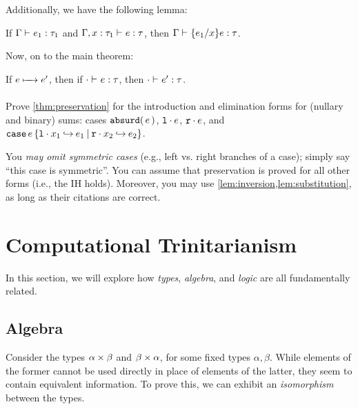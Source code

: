 \documentclass[11pt]{article}
\begin{document}
Additionally, we have the following lemma:
\begin{lemma}[Substitution]\label{lem:substitution}
  If $\Gamma \entails \IsOf{e_1}{\tau_1}$ and $\Gamma, \IsOf{x}{\tau_1} \entails \IsOf{e}{\tau}$,
  then $\Gamma \entails \IsOf{\Subst{e_1}{x}{e}}{\tau}$.
\end{lemma}

Now, on to the main theorem:

\begin{theorem}[Preservation]\label{thm:preservation}
  If $e \StepsTo e'$, then if $\cdot \entails \IsOf{e}{\tau}$, then $\cdot \entails \IsOf{e'}{\tau}$.
\end{theorem}

\begin{task}{25}
  Prove \cref{thm:preservation} for the introduction and elimination forms for (nullary and binary) sums:
  cases $\absurdexcst{\tau}{e}$, $\inlexcst{\tau_2}{e}$, $\inrexcst{\tau_1}{e}$, and $\caseexcst{e}{x_1}{\tau_1}{e_1}{x_2}{\tau_2}{e_2}$.

  You \emph{may omit symmetric cases} (e.g., left vs. right branches of a case); simply say ``this case is symmetric''.
  You can assume that preservation is proved for all other forms (i.e., the IH holds).
  Moreover, you may use \cref{lem:inversion,lem:substitution}, as long as their citations are correct.
\end{task}


\section{Computational Trinitarianism}

In this section, we will explore how \emph{types}, \emph{algebra}, and \emph{logic} are all fundamentally related.

\subsection{Algebra}

Consider the types $\prodtycst{\alpha}{\beta}$ and $\prodtycst{\beta}{\alpha}$, for some fixed types $\alpha, \beta$.
While elements of the former cannot be used directly in place of elements of the latter, they seem to contain equivalent information.
To prove this, we can exhibit an \emph{isomorphism} between the types.
\end{document}
